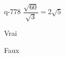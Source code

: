\begin{truefalse}{q-778}
$\dfrac{\sqrt{60}}{\sqrt{3}}=2\sqrt{5}$
\item* Vrai
\item Faux
\end{truefalse}


